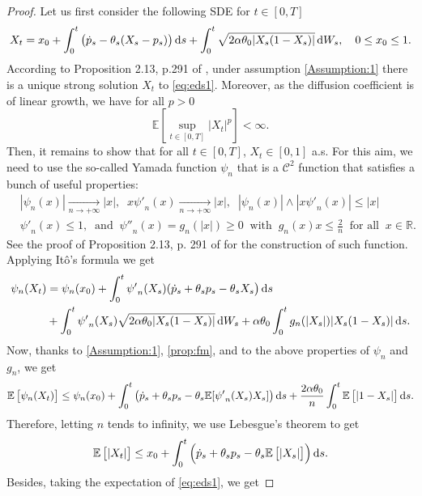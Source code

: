 \documentclass[11pt]{article}
\theoremstyle{definition}
\begin{document}
\begin{proof}
Let us first consider the following SDE for $t\in[0,T]$
\begin{equation}\label{eq:eds1}
X_t=x_0+  \int_0^t\big(\dot p_s - \theta_s(X_s-p_s)  \big)\dif s  + \int_0^t\sqrt{2\alpha \theta_0 |X_s(1-X_s)|} \dif W_s, \quad 0\leq x_0\leq1.
\end{equation}
According to Proposition 2.13, p.291 of \cite{KarShr}, under assumption  \eqref{Assumption:1} there is a unique strong solution $X_t$ to \eqref{eq:eds1}. Moreover, as the diffusion coefficient is of linear growth, we have  for all $p>0$ 
\begin{equation}\label{prop:fm}
\mathbb E\left[ \sup_{t\in[0,T]}|X_t|^p\right]<\infty.
\end{equation}
Then, it remains to show that for all $t\in[0,T]$, $X_t\in[0,1]$ a.s. For this aim, we need to use the so-called Yamada function $\psi_n$ that is a $\mathcal C^2$ function that satisfies a bunch of useful properties:
\begin{align*}
&|\psi_n(x)|\underset{n\rightarrow+\infty}{\rightarrow}|x|, \;\; x{\psi'}_n(x)\underset{n\rightarrow+\infty}{\rightarrow}|x|, \;\; |\psi_n(x)|\wedge |x{\psi'}_n(x)| \le |x|\\
&{\psi'}_n(x)\le 1, \;\; \mbox{and}\;\; {\psi''}_n(x)=g_n(|x|)\ge 0\;\; \mbox{with} \;\; g_n(x)x\le \frac 2n\;\;  \mbox{for all}\;\; x\in \mathbb R .
\end{align*}
See the proof of Proposition 2.13, p. 291 of \cite{KarShr} for the construction of such function.
Applying Itô's formula we get
\begin{align*}
\psi_n(X_t)&=\psi_n(x_0) +\int_0^t {\psi'}_n(X_s)(\dot p_s + \theta_s p_s - \theta_sX_s  \big)\dif s \\
&+ \int_0^t{\psi'}_n(X_s)\sqrt{2\alpha \theta_0 |X_s(1-X_s)|} \dif W_s + \alpha \theta_0 \int_0^t  g_n(|X_s|) |X_s(1-X_s)|\dif s.
\end{align*}
Now, thanks to  \eqref{Assumption:1}, \eqref{prop:fm}, and to the above properties of $\psi_n$ and $g_n$, we get
$$
\mathbb E\left[\psi_n(X_t)\right]\le \psi_n(x_0) +\int_0^t \left(\dot p_s + \theta_sp_s -  \theta_s \mathbb E[{\psi'}_n(X_s)X_s] \right)\dif s + \frac{2\alpha  \theta_0}{n}\int_0^t \mathbb E \left[|1-X_s|\right]\dif s.
$$
Therefore, letting $n$ tends to infinity, we use Lebesgue's theorem to get
$$
\mathbb E\left[|X_t|\right]\le x_0 +\int_0^t \left(\dot p_s + \theta_sp_s -  \theta_s \mathbb E\left[|X_s|\right] \right)\dif s.
$$
Besides, taking the expectation of \eqref{eq:eds1}, we get

\end{proof}
\end{document}
